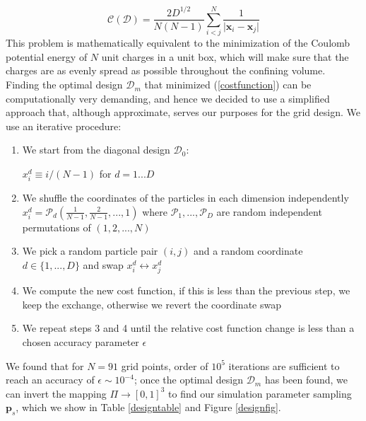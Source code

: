 \documentclass[reprint,aps,prd,superscriptaddress,showkeys,showpacs]{revtex4-1}
\begin{document}
\begin{equation}
\label{costfunction}
\mathcal{C}(\mathcal{D}) = \frac{2D^{1/2}}{N(N-1)}\sum_{i<j}^N\frac{1}{\vert\mathbf{x}_i-\mathbf{x}_j\vert}
\end{equation} 
%
This problem is mathematically equivalent to the minimization of the Coulomb potential energy of $N$ unit charges in a unit box, which will make sure that the charges are as evenly spread as possible throughout the confining volume. Finding the optimal design $\mathcal{D}_m$ that minimized (\ref{costfunction}) can be computationally very demanding, and hence we decided to use a simplified approach that, although approximate, serves our purposes for the grid design. We use an iterative procedure:
\begin{enumerate}
\item We start from the diagonal design $\mathcal{D}_0$: 

$x_i^d\equiv i/(N-1)$ for $d=1...D$
\item We shuffle the coordinates of the particles in each dimension independently $x_i^d = \mathcal{P}_d\left(\frac{1}{N-1},\frac{2}{N-1},...,1\right)$ where $\mathcal{P}_1,...,\mathcal{P}_D$ are random independent permutations of $(1,2,...,N)$
\item We pick a random particle pair $(i,j)$ and a random coordinate $d\in\{1,...,D\}$ and swap $x_i^d\leftrightarrow x_j^d$
\item We compute the new cost function, if this is less than the previous step, we keep the exchange, otherwise we revert the coordinate swap
\item We repeat steps 3 and 4 until the relative cost function change is less than a chosen accuracy parameter $\epsilon$ 
\end{enumerate}
%
We found that for $N=91$ grid points, order of $10^5$ iterations are sufficient to reach an accuracy of $\epsilon\sim10^{-4}$; once the optimal design $\mathcal{D}_m$ has been found, we can invert the mapping $\Pi\rightarrow[0,1]^3$ to find our simulation parameter sampling $\mathbf{p}_s$, which we show in Table \ref{designtable} and Figure \ref{designfig}.
%
\end{document}
